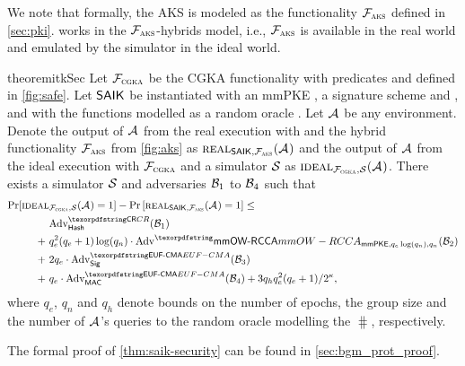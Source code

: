 We note that formally, the AKS is modeled as the functionality $\funcPKI$ defined in \cref{sec:pki}. \saik
works in the $\funcPKI$-hybrids model, i.e., $\funcPKI$ is available in the real world and emulated by the simulator in the ideal world.

\newcommand{\ucideal}{\textnormal{\textsc{ideal}}}
\newcommand{\ucreal}{\textnormal{\textsc{real}}}
\begin{restatable}{theorem}{itkSec}\label{thm:saik-security}
	Let $\funcCGKA$ be the CGKA functionality with predicates \KwConf{} and \KwAuth{} defined in \cref{fig:safe}. Let $\saik$ be instantiated with an mmPKE \mmPKE, a signature scheme \sigscheme and \mac, and with the \hkdf functions modelled as a random oracle \hash.
	Let $\Adv$ be any environment. Denote the output of $\Adv$ from the real execution with \saik and the hybrid functionality $\funcPKI$ from \cref{fig:aks} as $\ucreal_{\saik, \funcPKI}(\Adv)$ and the output of $\Adv$ from the ideal execution with $\funcCGKA$ and a simulator $\ucsim$ as $\ucideal_{\funcCGKA, \ucsim}(\Adv)$.
	There exists a simulator $\ucsim$ and adversaries $\Bdv[1]$ to $\Bdv[4]$ such that
	\begin{align*}
		\Pr[\ucideal&_{\funcCGKA, \ucsim}(\Adv) = 1] - \Pr\left[\ucreal_{\saik, \funcPKI}(\Adv) = 1\right] \leq \\
		&\textnormal{Adv}^{\gamefont{CR}}_{\hash}(\Bdv[1]) \\
		+\ & q_e^2(q_e+1) \log(q_n) \cdot\textnormal{Adv}^\mmowrcca_{\mmPKE,q_e\log(q_n),q_n}(\Bdv[2]) \\
		+\ & 2q_e\cdot \textnormal{Adv}^{\ufcma}_\sigscheme(\Bdv[3]) \\
		+\ & q_e \cdot \textnormal{Adv}^{\ufcma}_\mac(\Bdv[4]) + 3q_hq_e^2(q_e+1)/2^\kappa,
	\end{align*}
	where $q_e$, $q_n$ and $q_h$ denote bounds on the number of epochs, the group size and the number of $\Adv$'s queries to the random oracle modelling the $\hash$, respectively.
  \end{restatable}

  The formal proof of \cref{thm:saik-security} can be found in \cref{sec:bgm_prot_proof}.

